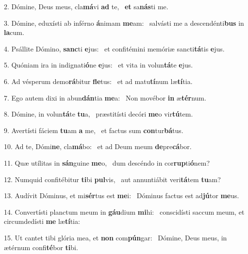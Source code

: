 2. Dómine, Deus meus, cla\textbf{má}vi \textbf{ad} te, \ast\  \textbf{et} sa\textbf{nás}ti me.\

3. Dómine, eduxísti ab inférno \textbf{á}nimam \textbf{me}am: \ast\  salvásti me a descendénti\textbf{bus} in \textbf{la}cum.\

4. Psállite Dómino, \textbf{sanc}ti \textbf{e}jus: \ast\  et confitémini memóriæ sancti\textbf{tá}tis \textbf{e}jus.\

5. Quóniam ira in indignati\textbf{ó}ne \textbf{e}jus: \ast\  et vita in volun\textbf{tá}te \textbf{e}jus.\

6. Ad vésperum demo\textbf{rá}bitur \textbf{fle}tus: \ast\  et ad matu\textbf{tí}num læ\textbf{tí}tia.\

7. Ego autem dixi in abun\textbf{dán}tia \textbf{me}a: \ast\  Non movébor \textbf{in} æ\textbf{tér}num.\

8. Dómine, in volun\textbf{tá}te \textbf{tu}a, \ast\  præstitísti decóri \textbf{me}o vir\textbf{tú}tem.\

9. Avertísti fáciem \textbf{tu}am \textbf{a} me, \ast\  et factus sum \textbf{con}tur\textbf{bá}tus.\

10. Ad te, Dómi\textbf{ne}, cla\textbf{má}bo: \ast\  et ad Deum meum \textbf{de}pre\textbf{cá}bor.\

11. Quæ utílitas in \textbf{sán}guine \textbf{me}o, \ast\  dum descéndo in cor\textbf{rup}ti\textbf{ó}nem?\

12. Numquid confitébitur \textbf{ti}bi \textbf{pul}vis, \ast\  aut annuntiábit veri\textbf{tá}tem \textbf{tu}am?\

13. Audívit Dóminus, et mi\textbf{sér}tus est \textbf{me}i: \ast\  Dóminus factus est ad\textbf{jú}tor \textbf{me}us.\

14. Convertísti planctum meum in \textbf{gáu}dium \textbf{mi}hi: \ast\  conscidísti saccum meum, et circumdedísti \textbf{me} læ\textbf{tí}tia:\

15. Ut cantet tibi glória mea, et \textbf{non} com\textbf{pún}gar: \ast\  Dómine, Deus meus, in ætérnum confi\textbf{té}bor \textbf{ti}bi.\

